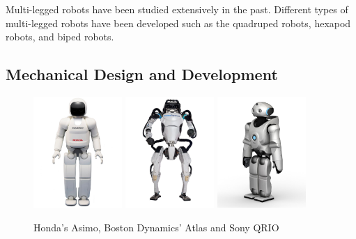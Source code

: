 Multi-legged robots have been studied extensively in the past.
Different types of multi-legged robots have been developed such as the quadruped robots, hexapod robots, and biped robots.
\subsection{Mechanical Design and Development}
\begin {figure}[h]
\centering
\includegraphics[width=0.3\textwidth]{Honda's Asimo}
\includegraphics[width=0.3\textwidth]{Boston Dynamics' Atlas}
\includegraphics[width=0.3\textwidth]{sony QRIO}
\caption{Honda's Asimo, Boston Dynamics' Atlas and Sony QRIO \cite{asimo} \cite{atlas} \cite{qrio}}
\label{fig:Asimo, Atlas and QRIO}
\end {figure}


